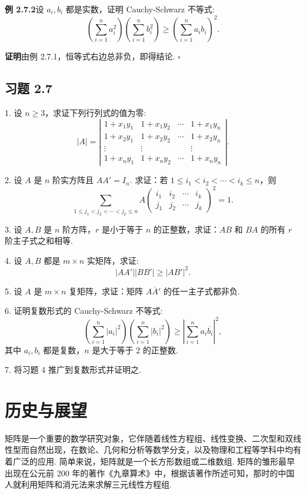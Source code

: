 \documentclass[UTF8,12pt,a4paper,fontset=fandol]{ctexart}
\begin{document}
\noindent\textbf{例 2.7.2}\quad 设 $a_i,b_i$ 都是实数，证明 Cauchy-Schwarz 不等式:
\[
\left(\sum_{i=1}^n a_i^2\right)\left(\sum_{i=1}^n b_i^2\right)\geq
\left(\sum_{i=1}^n a_ib_i\right)^2.
\]

\noindent\textbf{证明}\quad 由例 2.7.1，恒等式右边总非负，即得结论. $\square$

\subsection*{习题 2.7}

1. 设 $n\geq 3$，求证下列行列式的值为零:
\[
|A|=\left|\begin{array}{cccc}
1+x_1y_1 & 1+x_1y_2 & \cdots & 1+x_1y_n\\
1+x_2y_1 & 1+x_2y_2 & \cdots & 1+x_2y_n\\
\vdots & \vdots & & \vdots\\
1+x_ny_1 & 1+x_ny_2 & \cdots & 1+x_ny_n
\end{array}\right|.
\]

2. 设 $A$ 是 $n$ 阶实方阵且 $AA'=I_n$. 求证：若 $1\leq i_1<i_2<\cdots<i_k\leq n$，则
\[
\sum_{1\leq j_1<j_2<\cdots<j_k\leq n}
A\left(\begin{array}{cccc}
i_1 & i_2 & \cdots & i_k\\
j_1 & j_2 & \cdots & j_k
\end{array}\right)^2=1.
\]

3. 设 $A,B$ 是 $n$ 阶方阵，$r$ 是小于等于 $n$ 的正整数，求证：$AB$ 和 $BA$ 的所有 $r$ 阶主子式之和相等.

4. 设 $A,B$ 都是 $m\times n$ 实矩阵，求证:
\[
|AA'||BB'|\geq |AB'|^2.
\]

5. 设 $A$ 是 $m\times n$ 复矩阵，求证：矩阵 $A\overline{A}'$ 的任一主子式都非负.

6. 证明复数形式的 Cauchy-Schwarz 不等式:
\[
\left(\sum_{i=1}^n |a_i|^2\right)\left(\sum_{i=1}^n |b_i|^2\right)\geq
\left|\sum_{i=1}^n a_i\overline{b_i}\right|^2,
\]
其中 $a_i,b_i$ 都是复数，$n$ 是大于等于 2 的正整数.

7. 将习题 4 推广到复数形式并证明之.

\section*{历史与展望}

矩阵是一个重要的数学研究对象，它伴随着线性方程组、线性变换、二次型和双线性型而自然出现，在数论、几何和分析等数学分支，以及物理和工程等学科中均有着广泛的应用. 简单来说，矩阵就是一个长方形数组或二维数组. 矩阵的雏形最早出现在公元前 200 年的著作《九章算术》中，根据该著作所述可知，那时的中国人就利用矩阵和消元法来求解三元线性方程组.
\end{document}
